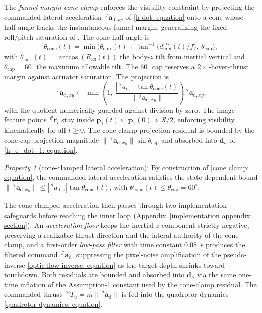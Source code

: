 \documentclass{IEEEtaes}
\begin{document}
The \emph{funnel-margin cone clamp} enforces the visibility constraint by projecting the commanded lateral acceleration $\,^\mathcal{I}\boldsymbol{a}_{\text{d},xy}$ of \eqref{h dot: equation} onto a cone whose half-angle tracks the instantaneous funnel margin, generalizing the fixed roll/pitch saturation of \cite{xie2016}. The cone half-angle is
\begin{equation} \label{cone angle: equation}
    \theta_\text{cone}(t) = \min\!\Big(\theta_\text{curr}(t) + \tan^{-1}\!\big(d_\text{min}^\text{fov}(t)/f\big),\ \theta_\text{cap}\Big),
\end{equation}
with $\theta_\text{curr}(t)=\arccos(R_{33}(t))$ the body-$z$ tilt from inertial vertical and $\theta_\text{cap}=60^\circ$ the maximum allowable tilt. The $60^\circ$ cap reserves a $2\times$-hover-thrust margin against actuator saturation. The projection is
\begin{equation} \label{cone clamp: equation}
    \,^\mathcal{I}\boldsymbol{a}_{\text{d},xy}\leftarrow \min\!\left(1,\ \frac{|\,^\mathcal{I}a_{\text{d},z}|\tan\theta_\text{cone}(t)}{\|\,^\mathcal{I}\boldsymbol{a}_{\text{d},xy}\|}\right)\!\,^\mathcal{I}\boldsymbol{a}_{\text{d},xy},
\end{equation}
with the quotient numerically guarded against division by zero. The image feature points $\,^\mathcal{C}\hat{\boldsymbol{r}}_i$ stay inside $\boldsymbol{p}_1(t)\subseteq\boldsymbol{p}_1(0)\preceq\mathcal{R}/2$, enforcing visibility kinematically for all $t\ge 0$. The cone-clamp projection residual is bounded by the cone-cap projection magnitude $\|\,^\mathcal{I}\boldsymbol{a}_{\text{d},xy}\|\sin\theta_\text{cap}$ and absorbed into $\boldsymbol{d}_h$ of \eqref{h_e_dot_1: equation}.

\textit{Property 1} (cone-clamped lateral acceleration): By construction of \eqref{cone clamp: equation}, the commanded lateral acceleration satisfies the state-dependent bound $\|\,^\mathcal{I}\boldsymbol{a}_{\text{d},xy}\|\le|\,^\mathcal{I}a_{\text{d},z}|\tan\theta_\text{cone}(t)$, with $\theta_\text{cone}(t)\le\theta_\text{cap}=60^\circ$.

The cone-clamped acceleration then passes through two implementation safeguards before reaching the inner loop (Appendix~\ref{implementation appendix: section}). An \emph{acceleration floor} keeps the inertial $z$-component strictly negative, preserving a realizable thrust direction and the lateral authority of the cone clamp, and a first-order \emph{low-pass filter} with time constant $0.08$~s produces the filtered command $\,^\mathcal{I}\tilde{\boldsymbol{a}}_\text{d}$, suppressing the pixel-noise amplification of the pseudo-inverse \eqref{optic flow inverse: equation} as the target depth shrinks toward touchdown. Both residuals are bounded and absorbed into $\boldsymbol{d}_h$ via the same one-time inflation of the Assumption-1 constant used by the cone-clamp residual. The commanded thrust $\,^\mathcal{B}T_u=m\|\,^\mathcal{I}\tilde{\boldsymbol{a}}_\text{d}\|$ is fed into the quadrotor dynamics \eqref{quadrotor dynamics: equation}.
\end{document}
